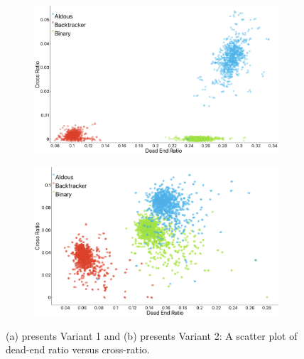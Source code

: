          \begin{figure}[!h]
            \centering
            \begin{subfigure}[!h]{0.7\textwidth}
                \includegraphics[width=1\linewidth]{crossvSDeas_variant1.png}
               \caption{}
            \end{subfigure}
            \begin{subfigure}[!h]{0.7\textwidth}
                \includegraphics[width=1\linewidth]{crossvSDead_variant2.png}
               \caption{}
            \end{subfigure}
            \caption{(a) presents Variant 1 and (b) presents Variant 2: A scatter plot of dead-end ratio versus cross-ratio.}
            \end{figure}
\newpage
